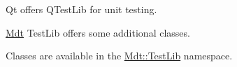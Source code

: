 Qt offers Q\+Test\+Lib for unit testing.

\hyperlink{namespace_mdt}{Mdt} Test\+Lib offers some additional classes.

Classes are available in the \hyperlink{namespace_mdt_1_1_test_lib}{Mdt\+::\+Test\+Lib} namespace. 